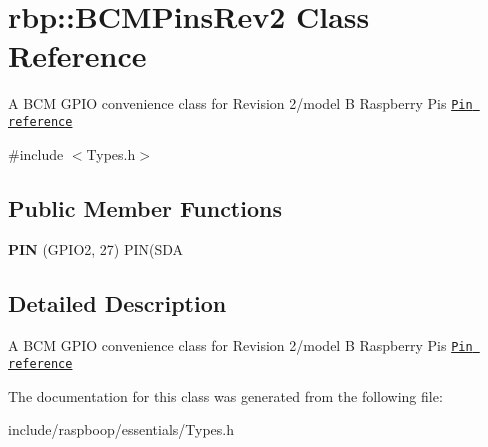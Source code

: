 \hypertarget{classrbp_1_1BCMPinsRev2}{}\section{rbp\+:\+:B\+C\+M\+Pins\+Rev2 Class Reference}
\label{classrbp_1_1BCMPinsRev2}


A B\+C\+M G\+P\+I\+O convenience class for Revision 2/model B Raspberry Pi\textquotesingle{}s \href{http://wiringpi.com/pins/}{\tt Pin reference}  




{\ttfamily \#include $<$Types.\+h$>$}

\subsection*{Public Member Functions}
\begin{DoxyCompactItemize}
\item 
\hypertarget{classrbp_1_1BCMPinsRev2_abb6fba0c4f44480d396504e0eaf5a9a6}{}{\bfseries P\+I\+N} (G\+P\+I\+O2, 27) P\+I\+N(S\+D\+A\label{classrbp_1_1BCMPinsRev2_abb6fba0c4f44480d396504e0eaf5a9a6}

\end{DoxyCompactItemize}


\subsection{Detailed Description}
A B\+C\+M G\+P\+I\+O convenience class for Revision 2/model B Raspberry Pi\textquotesingle{}s \href{http://wiringpi.com/pins/}{\tt Pin reference} 

The documentation for this class was generated from the following file\+:\begin{DoxyCompactItemize}
\item 
include/raspboop/essentials/Types.\+h\end{DoxyCompactItemize}
